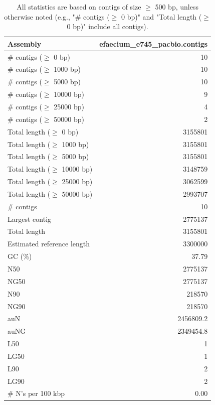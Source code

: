 \documentclass[12pt,a4paper]{article}
\begin{document}
\begin{table}[ht]
\begin{center}
\caption{All statistics are based on contigs of size $\geq$ 500 bp, unless otherwise noted (e.g., "\# contigs ($\geq$ 0 bp)" and "Total length ($\geq$ 0 bp)" include all contigs).}
\begin{tabular}{|l*{1}{|r}|}
\hline
Assembly & efaecium\_e745\_pacbio.contigs \\ \hline
\# contigs ($\geq$ 0 bp) & 10 \\ \hline
\# contigs ($\geq$ 1000 bp) & 10 \\ \hline
\# contigs ($\geq$ 5000 bp) & 10 \\ \hline
\# contigs ($\geq$ 10000 bp) & 9 \\ \hline
\# contigs ($\geq$ 25000 bp) & 4 \\ \hline
\# contigs ($\geq$ 50000 bp) & 2 \\ \hline
Total length ($\geq$ 0 bp) & 3155801 \\ \hline
Total length ($\geq$ 1000 bp) & 3155801 \\ \hline
Total length ($\geq$ 5000 bp) & 3155801 \\ \hline
Total length ($\geq$ 10000 bp) & 3148759 \\ \hline
Total length ($\geq$ 25000 bp) & 3062599 \\ \hline
Total length ($\geq$ 50000 bp) & 2993707 \\ \hline
\# contigs & 10 \\ \hline
Largest contig & 2775137 \\ \hline
Total length & 3155801 \\ \hline
Estimated reference length & 3300000 \\ \hline
GC (\%) & 37.79 \\ \hline
N50 & 2775137 \\ \hline
NG50 & 2775137 \\ \hline
N90 & 218570 \\ \hline
NG90 & 218570 \\ \hline
auN & 2456809.2 \\ \hline
auNG & 2349454.8 \\ \hline
L50 & 1 \\ \hline
LG50 & 1 \\ \hline
L90 & 2 \\ \hline
LG90 & 2 \\ \hline
\# N's per 100 kbp & 0.00 \\ \hline
\end{tabular}
\end{center}
\end{table}
\end{document}
